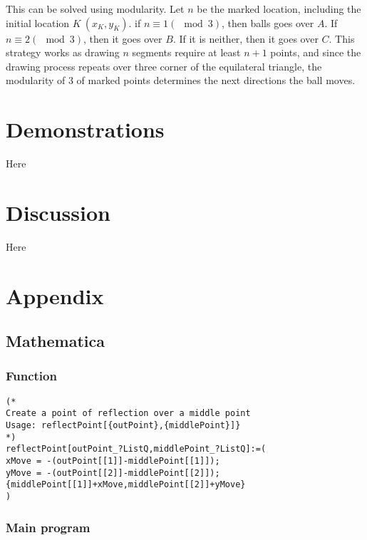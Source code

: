 \documentclass[11pt, a4paper]{article}
\begin{document}
This can be solved using modularity. Let \(n\) be the marked location, including the initial location \(K \ (x_K, y_K)\). if \(n \equiv 1 (\mod 3)\), then balls goes over \(A\). If \(n \equiv 2 (\mod 3)\), then it goes over \(B\). If it is neither, then it goes over \(C\). This strategy works as drawing \(n\) segments require at least \(n+1\) points, and since the drawing process repeats over three corner of the equilateral triangle, the modularity of 3 of marked points determines the next directions the ball moves.

\section{Demonstrations}
Here  

\section{Discussion}
Here

\pagebreak
\section{Appendix}
\subsection{Mathematica}
\subsubsection{Function}
\lstset{language=Mathematica}
\begin{lstlisting}
(*
Create a point of reflection over a middle point
Usage: reflectPoint[{outPoint},{middlePoint}]}
*)
reflectPoint[outPoint_?ListQ,middlePoint_?ListQ]:=(
xMove = -(outPoint[[1]]-middlePoint[[1]]);
yMove = -(outPoint[[2]]-middlePoint[[2]]);
{middlePoint[[1]]+xMove,middlePoint[[2]]+yMove}
)
\end{lstlisting} 

\subsubsection{Main program}
\end{document}
